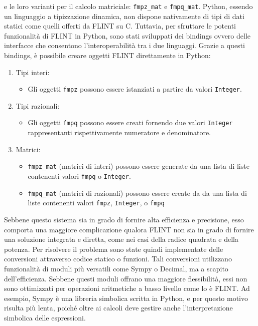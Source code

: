 e le loro varianti per il calcolo matriciale: \texttt{fmpz\_mat} e \texttt{fmpq\_mat}. 
Python, essendo un linguaggio a tipizzazione dinamica, non dispone nativamente di tipi 
di dati statici come quelli offerti da FLINT su C. Tuttavia, per sfruttare le potenti 
funzionalità di FLINT in Python, sono stati sviluppati dei bindings ovvero delle
interfacce che consentono l'interoperabilità tra i due linguaggi.
Grazie a questi bindings, è possibile creare oggetti FLINT direttamente in Python:
\begin{enumerate}
    \item Tipi interi:
    \begin{itemize}
        \item Gli oggetti \texttt{fmpz} possono essere istanziati a partire da valori 
        \texttt{Integer}.
    \end{itemize}
    \item Tipi razionali:
    \begin{itemize}
        \item Gli oggetti \texttt{fmpq} possono essere creati fornendo due valori 
        \texttt{Integer} rappresentanti rispettivamente numeratore e denominatore.
    \end{itemize}
    \item Matrici:
    \begin{itemize}
        \item \texttt{fmpz\_mat} (matrici di interi) possono essere generate da una 
        lista di liste 
        contenenti valori \texttt{fmpq} o \texttt{Integer}.
        \item \texttt{fmpq\_mat} (matrici di razionali) possono essere create da da una 
        lista di liste 
        contenenti valori \texttt{fmpz}, \texttt{Integer}, o \texttt{fmpq}
    \end{itemize}
\end{enumerate}
Sebbene questo sistema sia in grado di fornire alta efficienza e precisione, esso comporta
una maggiore complicazione qualora FLINT non sia in grado di fornire una soluzione integrata 
e diretta, come
nei casi della radice quadrata e della potenza. Per risolvere il problema sono
state quindi implementate delle conversioni attraverso codice statico o funzioni.
Tali conversioni utilizzano funzionalità di moduli più versatili come Sympy o Decimal, 
ma a scapito dell'efficienza. Sebbene questi moduli offrano una 
maggiore flessibilità, essi non sono ottimizzati per operazioni aritmetiche a basso livello 
come lo è FLINT. Ad esempio, Sympy è una libreria simbolica scritta in Python, e per 
questo motivo risulta più lenta, poiché oltre ai calcoli deve gestire anche 
l'interpretazione simbolica delle espressioni.

